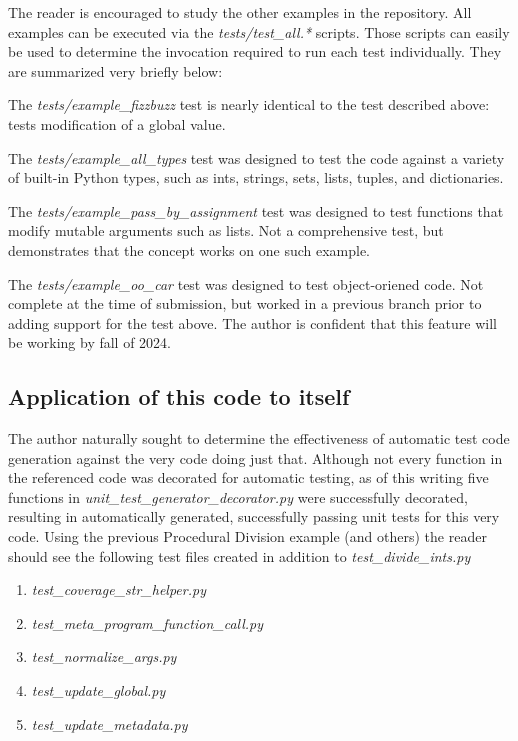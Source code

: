 The reader is encouraged to study the other examples in the repository.
All examples can be executed via the 
\textit{tests/test\_all.*} scripts.  Those
scripts can easily be used to determine the invocation required to run each 
test individually.  They are summarized very briefly below:

The \textit{tests/example\_fizzbuzz} test is nearly identical to the 
test described above: tests modification of a global value.

The \textit{tests/example\_all\_types} test was designed to test
the code against a variety of built-in Python types, 
such as ints, strings, sets, lists, tuples, and dictionaries.

The \textit{tests/example\_pass\_by\_assignment} test was designed to test
functions that modify mutable arguments such as lists. Not a comprehensive test,
but demonstrates that the concept works on one such example.

The \textit{tests/example\_oo\_car} test was designed to test
object-oriened code. Not complete at the time of submission, but worked in a 
previous branch prior to adding support for the test above.
The author is confident that this feature will be working by 
fall of 2024.
%
\subsection{Application of this code to itself}\label{sec:eval-2}

The author naturally sought to determine the effectiveness of automatic
test code generation against the very code doing just that.  Although not 
every function in the referenced code was decorated for automatic testing, 
as of this writing five functions in 
\textit{unit\_test\_generator\_decorator.py} were successfully decorated, 
resulting in automatically generated, successfully passing unit tests for this
very code.  Using the previous Procedural Division example (and others) 
the reader should see the following test files created in addition to 
\textit{test\_divide\_ints.py}

\begin{enumerate}
    \item \textit{test\_coverage\_str\_helper.py}
    \item \textit{test\_meta\_program\_function\_call.py}
    \item \textit{test\_normalize\_args.py}
    \item \textit{test\_update\_global.py}
    \item \textit{test\_update\_metadata.py}
\end{enumerate}

